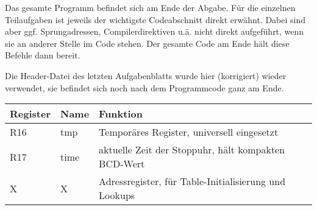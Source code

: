 \documentclass{CInf_practice}
\begin{document}
\cinftitle

Das gesamte Programm befindet sich am Ende der Abgabe.
Für die einzelnen Teilaufgaben ist jeweils der wichtigste Codeabschnitt
direkt erwähnt. Dabei sind aber ggf. Sprungadressen, Compilerdirektiven u.ä.
nicht direkt aufgeführt, wenn sie an anderer Stelle im Code stehen. Der gesamte
Code am Ende hält diese Befehle dann bereit.

Die Header-Datei des letzten Aufgabenblatts wurde hier (korrigiert) wieder 
verwendet, sie befindet sich noch nach dem Programmcode ganz am Ende.




\begin{tabular}{l|l|l}
\bf Register & \bf Name & \bf Funktion \\\hline
R16 & tmp & Temporäres Register, universell eingesetzt \\
R17 & time & aktuelle Zeit der Stoppuhr, hält kompakten BCD-Wert \\
X & X & Adressregister, für Table-Initialisierung und Lookups
\end{tabular}






\end{document}
